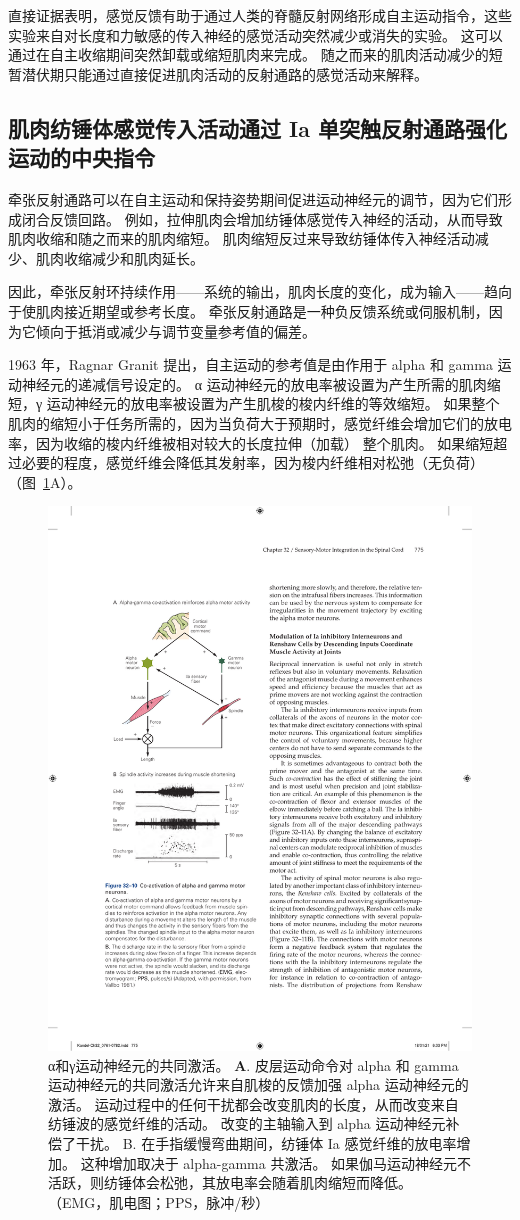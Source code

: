 直接证据表明，感觉反馈有助于通过人类的脊髓反射网络形成自主运动指令，这些实验来自对长度和力敏感的传入神经的感觉活动突然减少或消失的实验。
这可以通过在自主收缩期间突然卸载或缩短肌肉来完成。
随之而来的肌肉活动减少的短暂潜伏期只能通过直接促进肌肉活动的反射通路的感觉活动来解释。



\subsection{肌肉纺锤体感觉传入活动通过 Ia 单突触反射通路强化运动的中央指令}

牵张反射通路可以在自主运动和保持姿势期间促进运动神经元的调节，因为它们形成闭合反馈回路。
例如，拉伸肌肉会增加纺锤体感觉传入神经的活动，从而导致肌肉收缩和随之而来的肌肉缩短。
肌肉缩短反过来导致纺锤体传入神经活动减少、肌肉收缩减少和肌肉延长。


因此，牵张反射环持续作用——系统的输出，肌肉长度的变化，成为输入——趋向于使肌肉接近期望或参考长度。
牵张反射通路是一种负反馈系统或伺服机制，因为它倾向于抵消或减少与调节变量参考值的偏差。


1963 年，Ragnar Granit 提出，自主运动的参考值是由作用于 alpha 和 gamma 运动神经元的递减信号设定的。
α 运动神经元的放电率被设置为产生所需的肌肉缩短，γ 运动神经元的放电率被设置为产生肌梭的梭内纤维的等效缩短。
如果整个肌肉的缩短小于任务所需的，因为当负荷大于预期时，感觉纤维会增加它们的放电率，因为收缩的梭内纤维被相对较大的长度拉伸（加载） 整个肌肉。
如果缩短超过必要的程度，感觉纤维会降低其发射率，因为梭内纤维相对松弛（无负荷）（图~\ref{fig:32_10}A）。


\begin{figure}[htbp]
	\centering
	\includegraphics[width=0.5\linewidth]{chap32/fig_32_10}
	\caption{α和γ运动神经元的共同激活。
	\textbf{A}. 皮层运动命令对 alpha 和 gamma 运动神经元的共同激活允许来自肌梭的反馈加强 alpha 运动神经元的激活。
	运动过程中的任何干扰都会改变肌肉的长度，从而改变来自纺锤波的感觉纤维的活动。
	改变的主轴输入到 alpha 运动神经元补偿了干扰。
	B. 在手指缓慢弯曲期间，纺锤体 Ia 感觉纤维的放电率增加。
	这种增加取决于 alpha-gamma 共激活。
	如果伽马运动神经元不活跃，则纺锤体会松弛，其放电率会随着肌肉缩短而降低。\cite{vallbo1981basic} （EMG，肌电图；PPS，脉冲/秒）}
	\label{fig:32_10}
\end{figure}


